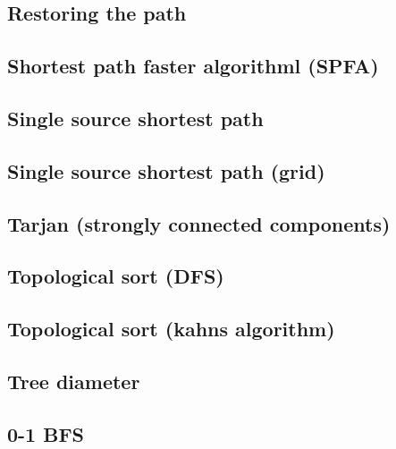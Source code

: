 \subsection{Restoring the path}
\raggedbottom
\hrulefill
\subsection{Shortest path faster algorithml (SPFA)}
\raggedbottom
\hrulefill
\subsection{Single source shortest path}
\raggedbottom
\hrulefill
\subsection{Single source shortest path (grid)}
\raggedbottom
\hrulefill
\subsection{Tarjan (strongly connected components)}
\raggedbottom
\hrulefill
\subsection{Topological sort (DFS)}
\raggedbottom
\hrulefill
\subsection{Topological sort (kahns algorithm)}
\raggedbottom
\hrulefill
\subsection{Tree diameter}
\raggedbottom
\hrulefill
\subsection{0-1 BFS}
\raggedbottom
\hrulefill
